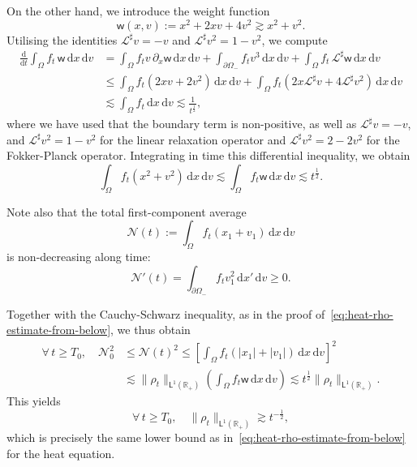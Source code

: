 \documentclass[11pt]{amsart}
\theoremstyle{definition}
\theoremstyle{remark}
\numberwithin{equation}{section}
\newcommand\R{{\mathbb R}}
\def\LL{{\mathcal L}}
\def\NN{{\mathcal N}}
\newcommand{\dd}{{\, \mathrm d}}
\newcommand{\sfL}{\mathsf{L}}
\begin{document}
On the other hand, we introduce the weight function
\begin{equation*}
  \mathsf{w}(x,v) := x^2 + 2 x v + 4 v^2 \gtrsim   x^2 + v^2.
\end{equation*}
Utilising the identities $\LL^\sharp v = -v$ and $\LL^\sharp v^2 = 1 - v^2$, we compute
\begin{align*}
  \frac{\mathrm{d}}{\mathrm{d}t} \int_\Omega f_t \, \mathsf{w} \dd x \dd v
  &= \int_\Omega f_t v \, \partial_x \mathsf{w} \dd x \dd v + \int_{\partial\Omega_-} f_t v^3 \dd x \dd v + \int_\Omega f_t \, \LL^\sharp \mathsf{w} \dd x \dd v \\
  &\leq \int_\Omega f_t \left(2 x v + 2 v^2\right) \dd x \dd v + \int_\Omega f_t \left(2 x \LL^\sharp v + 4 \LL^\sharp v^2\right) \dd x \dd v \\
  &\lesssim \int_\Omega f_t \dd x \dd v %
    \lesssim \frac{1}{t^{\frac{1}{2}}},
\end{align*}
where we have used that the boundary term is non-positive, as well as $\LL^\sharp v = -v$, and $\LL^\sharp v^2 = 1-v^2$ for the linear relaxation operator and $\LL^\sharp v^2 = 2-2v^2$ for the Fokker-Planck operator. Integrating in time this differential inequality,  we obtain
\begin{equation}
  \label{eq:rho-L12estimate-kinetic}
  \int_\Omega f_t \left( x^2+v^2 \right) \dd x \dd v \lesssim  \int_\Omega f_t \mathsf w \dd x \dd v \lesssim  t^{\frac12}.
\end{equation}

Note also that the total first-component average 
\begin{equation*}
  \NN(t):= \int_\Omega f_t \left( x_1 + v_1 \right) \dd x \dd v
\end{equation*}
is non-decreasing along time:
\begin{equation*}
  \NN'(t) = \int_{\partial \Omega_-} f_t v_1^2 \dd x' \dd v \ge 0.
\end{equation*}

Together with  the Cauchy-Schwarz inequality, as in the proof of~\eqref{eq:heat-rho-estimate-from-below}, we thus obtain
\begin{align*}
  \forall\, t \ge T_0, \quad \NN_0^2
  & \le \NN(t)^2 \le \left[ \int_\Omega f_t \left( |x_1| + |v_1| \right) \dd x \dd v \right]^2 \\
  & \lesssim \| \rho_t \|_{\sfL^{1}(\R_+)} \left( \int_\Omega f_t \mathsf w \dd x \dd v \right)  \lesssim t^{\frac{1}{2}} \| \rho_t \|_{\sfL^{1}(\R_+)}.
\end{align*}
This yields
\begin{equation}
  \label{eq:rho1}
  \forall\, t \ge T_0, \quad \| \rho_t \|_{\sfL^{1}(\R_+)} \gtrsim t^{-\frac{1}{2}},
\end{equation}
which is precisely the same lower bound as in~\eqref{eq:heat-rho-estimate-from-below} for the heat equation.
\end{document}

